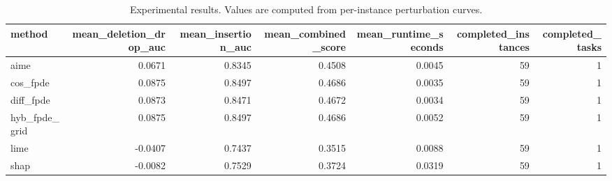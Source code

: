 \begin{table}[t]
\caption{Experimental results. Values are computed from per-instance perturbation curves.}
\label{tab:main_results_computed}
\centering
\begin{tabular}{lrrrrrr}
\toprule
method & mean\_deletion\_drop\_auc & mean\_insertion\_auc & mean\_combined\_score & mean\_runtime\_seconds & completed\_instances & completed\_tasks \\
\midrule
aime & 0.0671 & 0.8345 & 0.4508 & 0.0045 & 59 & 1 \\
cos\_fpde & 0.0875 & 0.8497 & 0.4686 & 0.0035 & 59 & 1 \\
diff\_fpde & 0.0873 & 0.8471 & 0.4672 & 0.0034 & 59 & 1 \\
hyb\_fpde\_grid & 0.0875 & 0.8497 & 0.4686 & 0.0052 & 59 & 1 \\
lime & -0.0407 & 0.7437 & 0.3515 & 0.0088 & 59 & 1 \\
shap & -0.0082 & 0.7529 & 0.3724 & 0.0319 & 59 & 1 \\
\bottomrule
\end{tabular}

\end{table}
